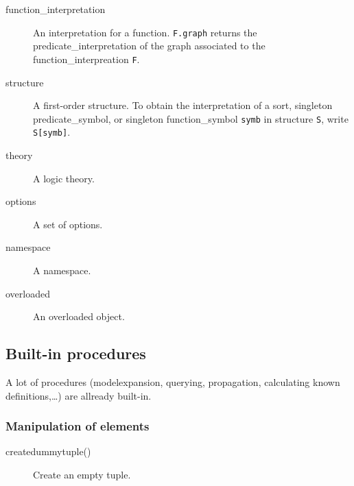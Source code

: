 \documentclass[a4]{article}
\begin{document}
\begin{description}
	\item[function\_interpretation] An interpretation for a function. {\tt F.graph} returns the predicate\_interpretation of the graph associated to the function\_interpreation {\tt F}. %
	\item[structure] A first-order structure. To obtain the interpretation of a sort, singleton predicate\_symbol, or singleton function\_symbol {\tt symb} in structure {\tt S}, write {\tt S[symb]}.
	\item[theory] A logic theory.
	\item[options] A set of options.
	\item[namespace] A namespace.
	\item[overloaded] An overloaded object.
\end{description}


\subsection{Built-in procedures}

A lot of procedures (modelexpansion, querying, propagation, calculating known definitions,\ldots) are allready built-in.  
\subsubsection{Manipulation of elements}
\begin{description}
	\item[createdummytuple()]
		Create an empty tuple.
\end{description}
\end{document}
